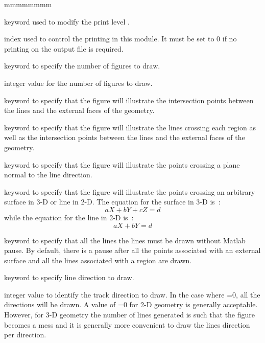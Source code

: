 \begin{ListeDeDescription}{mmmmmmmm}   

\item[\moc{EDIT}] keyword used to modify the print level .

\item[\dusa{iprint}] index used to control the printing in this module. It must be set to 0 if no printing on the output
file is required. 

\item[\moc{NTPO}] keyword to specify the number of figures to draw.

\item[\dusa{nplots}] integer value for the number of figures to draw.

\item[\moc{POINTS}] keyword to specify that the figure will illustrate the intersection points between the lines and the external faces of the geometry.

\item[\moc{DIRECTIONS}] keyword to specify that the figure will illustrate the lines crossing each region as well as the intersection points between the lines
and the external faces of the geometry.

\item[\moc{PLANP}] keyword to specify that the figure will illustrate the points crossing a plane normal to the line direction.

\item[\moc{PLANA}] keyword to specify that the figure will illustrate the points crossing an arbitrary surface in 3-D or line in 2-D. The equation for the
surface in 3-D is~:
$$
\textit{a} X + \textit{b} Y + \textit{c} Z =\textit{d} 
$$
while the equation for the line in 2-D is~:
$$
\textit{a} X + \textit{b} Y =\textit{d} 
$$

\item[\moc{NoPause}] keyword to specify that all the lines the lines must be drawn without Matlab pause. By default, there is a pause after all the points
associated with an external surface and all the lines associated with a region are drawn.

\item[\moc{DIR}] keyword to specify line direction to draw.

\item[\dusa{idir}] integer value to identify the track direction to draw. In the case where =0, all the directions will be drawn. A value of  
=0 for 2-D geometry is generally acceptable. However, for 3-D geometry the number of lines generated is such that the figure becomes a mess and it
is generally more convenient to draw the lines direction per direction.


\end{ListeDeDescription}
